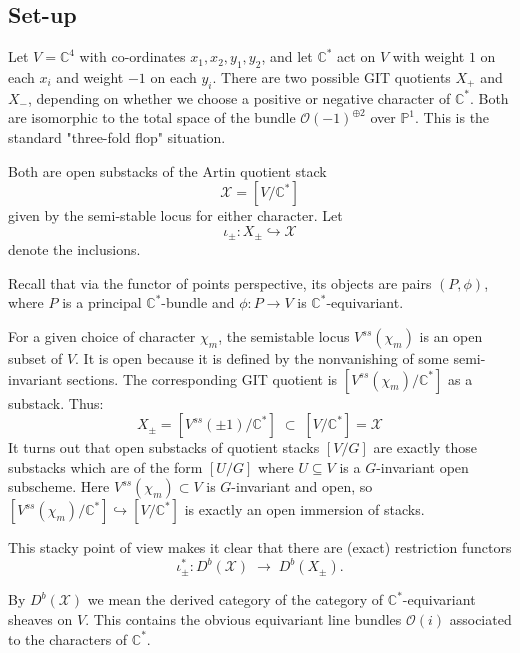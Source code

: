 \documentclass[12pt]{article}
\begin{document}
\subsection{Set-up}

Let $V = \mathbb{C}^4$ with co-ordinates $x_1, x_2, y_1, y_2$, and let $\mathbb{C}^*$ act on $V$ with weight $1$ on each $x_i$ and weight $-1$ on each $y_i$. There are two possible GIT quotients $X_{+}$ and $X_{-}$, depending on whether we choose a positive or negative character of $\mathbb{C}^*$. Both are isomorphic to the total space of the bundle $\mathcal{O}(-1)^{\oplus 2}$ over $\mathbb{P}^1$. This is the standard "three-fold flop" situation.

Both are open substacks of the Artin quotient stack
\[
  \mathcal{X} = [V/\mathbb{C}^*]
\]
given by the semi-stable locus for either character.
Let
\[
  \iota_{\pm} : X_{\pm} \hookrightarrow \mathcal{X}
\]
denote the inclusions.

\begin{remark}
  Recall that via the functor of points perspective, its objects are pairs $(P,\phi)$, where $P$ is a principal $\mathbb{C}^*$-bundle and $\phi: P\to V$ is $\mathbb{C}^*$-equivariant.

  For a given choice of character $\chi_m$, the semistable locus $V^{ss}(\chi_m)$ is an open subset of $V$. It is open because it is defined by the nonvanishing of some semi-invariant sections. The corresponding GIT quotient is $[V^{ss}(\chi_m)/\mathbb{C}^*]$ as a substack.
  Thus:
  \[
    X_\pm = [V^{ss}(\pm 1)/\mathbb{C}^*] \;\subset\; [V/\mathbb{C}^*] = \mathcal{X}
  \]
  It turns out that open substacks of quotient stacks $[V/G]$ are exactly those substacks which are of the form $[U/G]$ where $U\subseteq V$ is a $G$-invariant open subscheme. Here $V^{ss}(\chi_m)\subset V$ is $G$-invariant and open, so $[V^{ss}(\chi_m)/\mathbb{C}^*]\hookrightarrow [V/\mathbb{C}^*]$ is exactly an open immersion of stacks.
\end{remark}

This stacky point of view makes it clear that there are (exact) restriction functors
\[
  \iota_{\pm}^* : D^b(\mathcal{X}) \;\to\; D^b(X_{\pm}).
\]

By $D^b(\mathcal{X})$ we mean the derived category of the category of $\mathbb{C}^*$-equivariant sheaves on $V$. This contains the obvious equivariant line bundles $\mathcal{O}(i)$ associated to the characters of $\mathbb{C}^*$.
\end{document}
